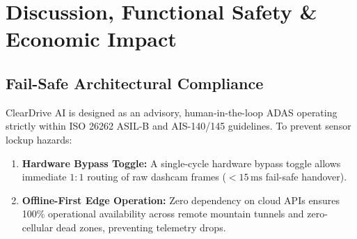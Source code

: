 \documentclass[conference]{IEEEtran}
\begin{document}
\begin{table}[t]
\centering
\caption{Ablation Study of Algorithmic Components}
\label{tab:ablation}
\end{table}

\section{Discussion, Functional Safety \& Economic Impact}

\subsection{Fail-Safe Architectural Compliance}
ClearDrive AI is designed as an advisory, human-in-the-loop ADAS operating strictly within ISO 26262 ASIL-B \cite{iso26262_2024} and AIS-140/145 guidelines. To prevent sensor lockup hazards:
\begin{enumerate}
    \item \textbf{Hardware Bypass Toggle:} A single-cycle hardware bypass toggle allows immediate $1:1$ routing of raw dashcam frames ($<15\,\text{ms}$ fail-safe handover).
    \item \textbf{Offline-First Edge Operation:} Zero dependency on cloud APIs ensures 100\% operational availability across remote mountain tunnels and zero-cellular dead zones, preventing telemetry drops.
\end{enumerate}
\end{document}
